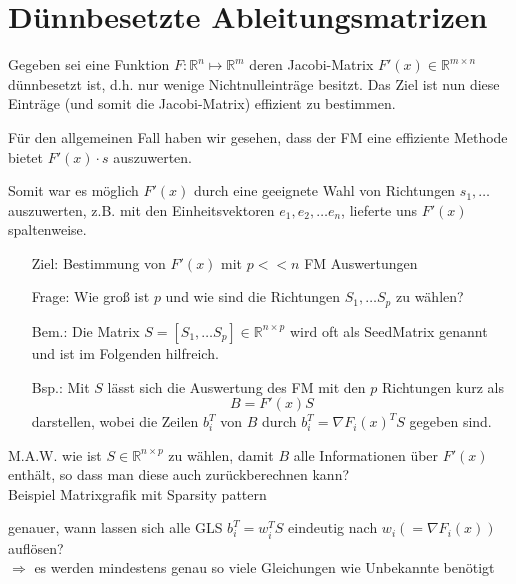 \section{Dünnbesetzte Ableitungsmatrizen}
\label{chap:sparsemats}

Gegeben sei eine Funktion $F:\mathbb{R}^n\mapsto\mathbb{R}^m$ deren Jacobi-Matrix $F'(x) \in \mathbb{R}^{m\times n}$ dünnbesetzt ist, d.h. nur wenige Nichtnulleinträge besitzt. Das Ziel ist nun diese Einträge (und somit die Jacobi-Matrix) effizient zu bestimmen.

\noindent
Für den allgemeinen Fall haben wir gesehen, dass der FM eine effiziente Methode bietet $F'(x)\cdot s$ auszuwerten.

\noindent
Somit war es möglich $F'(x)$ durch eine geeignete Wahl von Richtungen  $s_1,\dots$ auszuwerten, z.B. mit den Einheitsvektoren $e_1,e_2, \dots e_n$, lieferte uns $F'(x)$ spaltenweise.\\


\begin{itemize}
	\item[Ziel:] Bestimmung von $F'(x)$ mit $p <<n$ FM Auswertungen
	\item[Frage:]Wie groß ist $p$ und wie sind die Richtungen $S_1,\dots S_p$ zu wählen?
	\item[Bem.:] Die Matrix $S = [S_1, \dots S_p] \in \mathbb{R}^{n\times p}$ wird oft als \glqq Seed\grqq Matrix genannt und ist im Folgenden hilfreich.
	\item[Bsp.:]
	Mit $S$ lässt sich die Auswertung des FM mit den $p$ Richtungen kurz als 
	$$B = F'(x)S$$
	darstellen, wobei die Zeilen $b_i^T$ von $B$ durch $b_i^T = \nabla F_i(x)^TS$ gegeben sind.
\end{itemize}

\noindent
M.A.W. wie ist $S\in\mathbb{R}^{n\times p}$ zu wählen, damit $B$ alle Informationen über $F'(x)$ enthält, so dass man diese auch zurückberechnen kann?\\

\noindent
Beispiel Matrixgrafik mit Sparsity pattern\\
\vspace{3cm}

\noindent
genauer, wann lassen sich alle GLS $b_i^T = w_i^TS$ eindeutig nach $w_i (=\nabla F_i(x))$ auflösen?\\
$\Rightarrow$ es werden mindestens genau so viele Gleichungen wie Unbekannte benötigt\\

